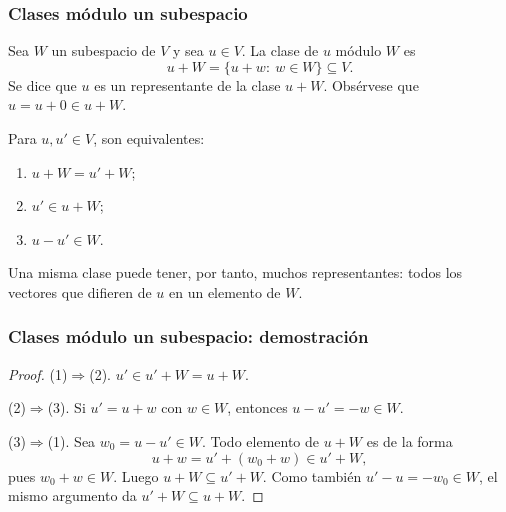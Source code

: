 \begin{frame}
    \frametitle{Clases módulo un subespacio}

    \begin{definition}
        Sea $W$ un subespacio de $V$ y sea $u\in V$. La \alert{clase} de $u$
        módulo $W$ es
        \[
            u+W=\{u+w:\ w\in W\}\subseteq V.
        \]
        Se dice que $u$ es un \alert{representante} de la clase $u+W$. Obsérvese que $u = u+0\in u+W$.
    \end{definition}

    \begin{proposition}
        Para $u,u'\in V$, son equivalentes:
        \begin{enumerate}[(1)]
            \item $u+W=u'+W$;
            \item $u'\in u+W$;
            \item $u-u'\in W$.
        \end{enumerate}
    \end{proposition}

    Una misma clase puede tener, por tanto, muchos representantes: todos los
    vectores que difieren de $u$ en un elemento de $W$.
\end{frame}


\begin{frame}[t]
    \frametitle{Clases módulo un subespacio: demostración}

    \begin{proof}
        \alert{(1)$\Rightarrow$(2).} $u'\in u'+W=u+W$.

        \alert{(2)$\Rightarrow$(3).} Si $u'=u+w$ con $w\in W$, entonces
        $u-u'=-w\in W$.

        \alert{(3)$\Rightarrow$(1).} Sea $w_0=u-u'\in W$. Todo elemento de
        $u+W$ es de la forma
        \[
            u+w=u'+(w_0+w)\in u'+W,
        \]
        pues $w_0+w\in W$. Luego $u+W\subseteq u'+W$. Como también
        $u'-u=-w_0\in W$, el mismo argumento da $u'+W\subseteq u+W$.
    \end{proof}
\end{frame}


